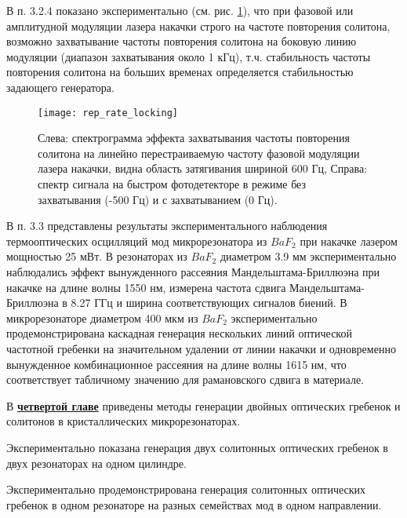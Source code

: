 В п. 3.2.4 показано экспериментально (см. рис. \ref{rep_rate_locking}), что при фазовой или амплитудной модуляции лазера накачки строго на частоте повторения солитона, возможно захватывание частоты повторения солитона на боковую линию модуляции (диапазон захватывания около 1 кГц), т.ч. стабильность частоты повторения солитона на больших временах определяется стабильностью задающего генератора.

\begin{figure}[ht]
  \centering
  \texttt{[image: rep\_rate\_locking]}
  \caption{Слева: спектрограмма эффекта захватывания частоты повторения солитона на линейно перестраиваемую частоту фазовой модуляции лазера накачки, видна область затягивания шириной 600 Гц, Справа: спектр сигнала на быстром фотодетекторе в режиме без захватывания (-500 Гц) и с захватыванием (0 Гц).}
  \label{rep_rate_locking}
\end{figure}

В п. 3.3 представлены результаты экспериментального наблюдения термооптических осцилляций мод микрорезонатора из $BaF_2$ при накачке лазером мощностью 25 мВт. В резонаторах из $BaF_2$ диаметром 3.9 мм экспериментально наблюдались эффект вынужденного рассеяния Мандельштама-Бриллюэна при накачке на длине волны 1550 нм, измерена частота сдвига Мандельштама-Бриллюэна в 8.27 ГГц и ширина соответствующих сигналов биений. В микрорезонаторе диаметром 400 мкм из $BaF_2$ экспериментально продемонстрирована каскадная генерация нескольких линий оптической частотной гребенки на значительном удалении от линии накачки и одновременно вынужденное комбинационное рассеяния на длине волны 1615 нм, что соответствует табличному значению для рамановского сдвига в материале.

В \underline{\textbf{четвертой главе}} приведены методы генерации двойных оптических гребенок и солитонов в кристаллических микрорезонаторах.

Экспериментально показана генерация двух солитонных оптических гребенок в двух резонаторах на одном цилиндре.

Экспериментально продемонстрирована генерация солитонных оптических гребенок в одном резонаторе на разных семействах мод в одном направлении.

